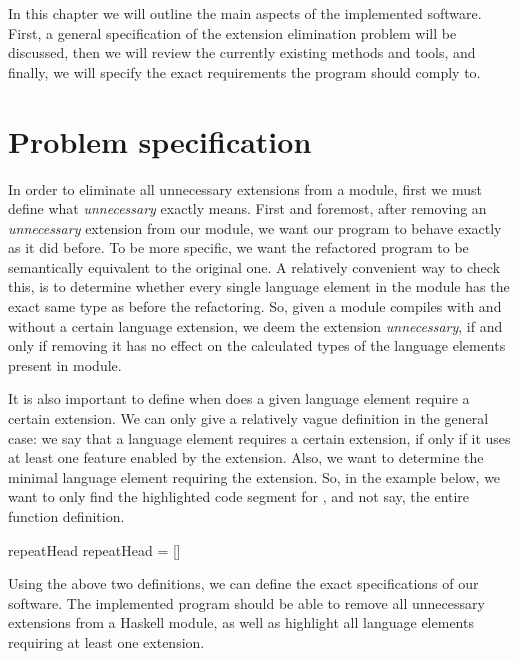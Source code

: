 \documentclass[main.tex]{subfiles}
\begin{document}
	
	In this chapter we will outline the main aspects of the implemented software. First, a general specification of the extension elimination problem will be discussed, then we will review the currently existing methods and tools, and finally, we will specify the exact requirements the program should comply to.
	
	\section{Problem specification}
	
	In order to eliminate all unnecessary extensions from a module, first we must define what \emph{unnecessary} exactly means. First and foremost, after removing an \emph{unnecessary} extension from our module, we want our program to behave exactly as it did before. To be more specific, we want the refactored program to be semantically equivalent to the original one. A relatively convenient way to check this, is to determine whether every single language element in the module has the exact same type as before the refactoring. So, given a module compiles with and without a certain language extension, we deem the extension \emph{unnecessary}, if and only if removing it has no effect on the calculated types of the language elements present in module.
	
	It is also important to define when does a given language element require a certain extension. We can only give a relatively vague definition in the general case: we say that a language element requires a certain extension, if only if it uses at least one feature enabled by the extension. Also, we want to determine the minimal language element requiring the extension. So, in the example below, we want to only find the highlighted code segment for , and not say, the entire function definition.
	
	\vspace{-0.3cm}
	\begin{haskell}
		repeatHead  %
		repeatHead = []
	\end{haskell}
	
	Using the above two definitions, we can define the exact specifications of our software. The implemented program should be able to remove all unnecessary extensions from a Haskell module, as well as highlight all language elements requiring at least one extension.
	
	\vspace{-0.3cm}
	
\end{document}
